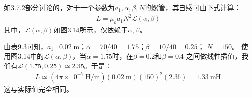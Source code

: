 如3.7.2部分讨论的，对于一个参数为$a_1,\alpha,\beta,N$的螺管，其自感可由下式计算：
\begin{align*}%
L=\mu_oa_1N^2\mathcal{L}(\alpha,\beta) \tag{3.81}
\end{align*}
其中，$\mathcal{L}(\alpha,\beta)$如图3.14所示，仅依赖于$\alpha,\beta$。

由表9.3可知，$a_1$=0.02 m；$\alpha=70/40=1.75$；$\beta=10/40=0.25$；
$N=150$。
使用图3.14中的$\mathcal{L}(\alpha,\beta)$，当$\alpha=1.75$时，在$\beta=0.2$和$\beta=0.4$
之间做线性插值，我们有$\mathcal{L}(1.75,0.25)\simeq2.35$。于是：
\begin{align*}%
L\simeq(4\pi\times 10^{-7}\ \mathrm{H/m})(0.02\ \mathrm{m})(150)^2(2.35)=1.33\ \mathrm{mH}
\end{align*}
这与实际值完全相同。



